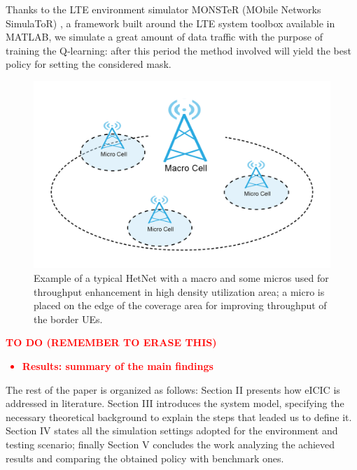 \documentclass[conference,10pt]{IEEEtran}
\begin{document}
Thanks to the LTE environment simulator MONSTeR (MObile Networks SimulaToR) \cite{monster}, a framework built around the LTE system toolbox available in MATLAB, we simulate a great amount of data traffic with the purpose of training the Q-learning: after this period the method involved will yield the best policy for setting the considered mask.
\begin{figure}[h]
\includegraphics[scale=0.80]{figures/ABS.png}
\caption{Example of a typical HetNet with a macro and some micros used for throughput enhancement in high density utilization area; a micro is placed on the edge of the coverage area for improving throughput of the border UEs. }\label{img:hetnet}
\end{figure}     


\textcolor{red}{
\textbf{TO DO (REMEMBER TO ERASE THIS)}
\begin{itemize}
\item \textbf{Results: summary of the main findings}
\end{itemize}}

The rest of the paper is organized as follows: Section II
presents how eICIC is addressed in literature. Section III introduces the system
model, specifying the necessary theoretical background to explain the steps that leaded us to define it. 
Section IV states all the simulation settings adopted for the environment and testing scenario; finally Section V  concludes the work analyzing the achieved results and comparing the obtained policy with benchmark ones.


\end{document}
